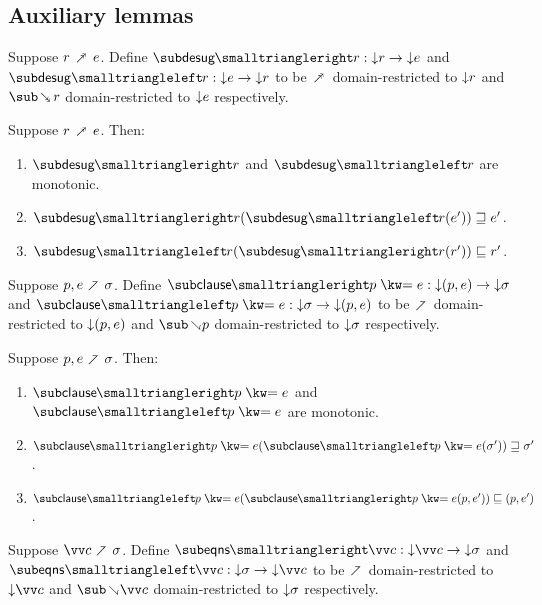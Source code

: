 \subsection{Auxiliary lemmas}

\begin{definition}
   Suppose $r \dfwdarrow e$. Define $\desugarListRestFwdF{r}: \Below{r} \to \Below{e}$ and $\desugarListRestBwdF{r}: \Below{e} \to \Below{r}$ to be $\desugarFwd$ domain-restricted to ${\downarrow}{r}$ and $\desugarBwd{r}$ domain-restricted to ${\downarrow}{e}$ respectively.
\end{definition}

\begin{lemma}
  \label{lem:aux:desugarlistrest:gc}
  Suppose $r \dfwdarrow e$. Then:
  \begin{enumerate}
     \item $\desugarListRestFwdF{r}$ and $\desugarListRestBwdF{r}$ are monotonic.
     \item $\desugarListRestFwdF{r}(\desugarListRestBwdF{r}(e')) \geq e'$.
     \item $\desugarListRestBwdF{r}(\desugarListRestFwdF{r}(r')) \leq r'$.
  \end{enumerate}
\end{lemma}

\begin{definition}
   Suppose $p, e \clauseFwd \sigma$. Define $\clauseFwdF{\clause{p}{e}}: \Below{(p,e)} \to \Below{\sigma}$ and $\clauseBwdF{\clause{p}{e}}: \Below{\sigma} \to \Below{(p,e)}$ to be $\clauseFwd$ domain-restricted to ${\downarrow}{(p,e)}$ and $\clauseBwd{p}$ domain-restricted to ${\downarrow}{\sigma}$ respectively.
\end{definition}

\begin{lemma}
  \label{lem:aux:clause:gc}
  Suppose $p, e \clauseFwd \sigma$. Then:
  \begin{enumerate}
     \item $\clauseFwdF{\clause{p}{e}}$ and $\clauseBwdF{\clause{p}{e}}$ are monotonic.
     \item $\clauseFwdF{\clause{p}{e}}(\clauseBwdF{\clause{p}{e}}(\sigma')) \geq \sigma'$.
     \item $\clauseBwdF{\clause{p}{e}}(\clauseFwdF{\clause{p}{e}}(p,e')) \leq (p,e')$.
  \end{enumerate}
\end{lemma}

\begin{definition}
   Suppose $\vec{c} \clauseFwd \sigma$. Define $\desugarClausesFwdF{\vec{c}}: \Below{\vec{c}} \to \Below{\sigma}$ and $\desugarClausesBwdF{\vec{c}}: \Below{\sigma} \to \Below{\vec{c}}$ to be $\clauseFwd$ domain-restricted to $\Below{\vec{c}}$ and $\clauseBwd{\vec{c}}$ domain-restricted to ${\downarrow}{\sigma}$ respectively.
\end{definition}

